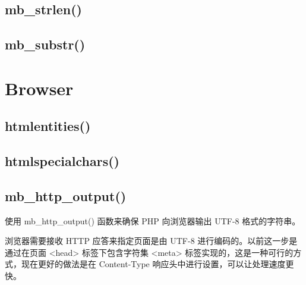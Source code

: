 \subsection{mb\_strlen()}


\subsection{mb\_substr()}






\section{Browser}



\subsection{htmlentities()}


\subsection{htmlspecialchars()}

\subsection{mb\_http\_output()}


使用 mb\_http\_output() 函数来确保 PHP 向浏览器输出 UTF-8 格式的字符串。

浏览器需要接收 HTTP 应答来指定页面是由 UTF-8 进行编码的。以前这一步是通过在页面 <head> 标签下包含字符集 <meta> 标签实现的，这是一种可行的方式，现在更好的做法是在 Content-Type 响应头中进行设置，可以让处理速度更快。


